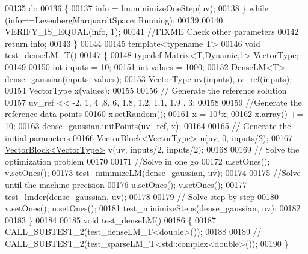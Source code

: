 \begin{DoxyCode}
00135   \textcolor{keywordflow}{do} 
00136   \{
00137     info = lm.minimizeOneStep(uv);
00138   \} \textcolor{keywordflow}{while} (info==LevenbergMarquardtSpace::Running);
00139   
00140   VERIFY\_IS\_EQUAL(info, 1);
00141   \textcolor{comment}{//FIXME Check other parameters}
00142   \textcolor{keywordflow}{return} info;
00143 \}
00144 
00145 \textcolor{keyword}{template}<\textcolor{keyword}{typename} T>
00146 \textcolor{keywordtype}{void} test\_denseLM\_T()
00147 \{
00148   \textcolor{keyword}{typedef} \hyperlink{group___core___module_class_eigen_1_1_matrix}{Matrix<T,Dynamic,1>} VectorType;
00149   
00150   \textcolor{keywordtype}{int} inputs = 10; 
00151   \textcolor{keywordtype}{int} values = 1000; 
00152   \hyperlink{struct_dense_l_m}{DenseLM<T>} dense\_gaussian(inputs, values);
00153   VectorType uv(inputs),uv\_ref(inputs);
00154   VectorType x(values);
00155   
00156   \textcolor{comment}{// Generate the reference solution }
00157   uv\_ref << -2, 1, 4 ,8, 6, 1.8, 1.2, 1.1, 1.9 , 3;
00158   
00159   \textcolor{comment}{//Generate the reference data points}
00160   x.setRandom();
00161   x = 10*x;
00162   x.array() += 10;
00163   dense\_gaussian.initPoints(uv\_ref, x);
00164   
00165   \textcolor{comment}{// Generate the initial parameters }
00166   \hyperlink{group___core___module_class_eigen_1_1_vector_block}{VectorBlock<VectorType>} u(uv, 0, inputs/2); 
00167   \hyperlink{group___core___module_class_eigen_1_1_vector_block}{VectorBlock<VectorType>} v(uv, inputs/2, inputs/2);
00168   
00169   \textcolor{comment}{// Solve the optimization problem}
00170   
00171   \textcolor{comment}{//Solve in one go}
00172   u.setOnes(); v.setOnes();
00173   test\_minimizeLM(dense\_gaussian, uv);
00174   
00175   \textcolor{comment}{//Solve until the machine precision}
00176   u.setOnes(); v.setOnes();
00177   test\_lmder(dense\_gaussian, uv); 
00178   
00179   \textcolor{comment}{// Solve step by step}
00180   v.setOnes(); u.setOnes();
00181   test\_minimizeSteps(dense\_gaussian, uv);
00182   
00183 \}
00184 
00185 \textcolor{keywordtype}{void} test\_denseLM()
00186 \{
00187   CALL\_SUBTEST\_2(test\_denseLM\_T<double>());
00188   
00189   \textcolor{comment}{// CALL\_SUBTEST\_2(test\_sparseLM\_T<std::complex<double>());}
00190 \}
\end{DoxyCode}
